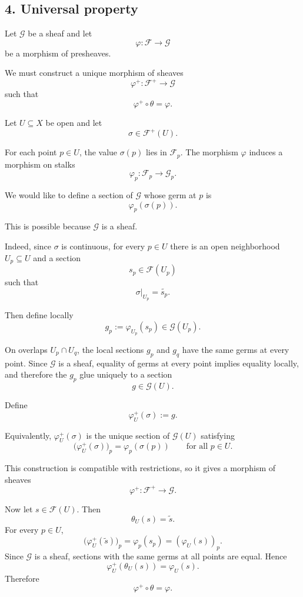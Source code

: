 \documentclass[12pt,a4paper]{article}
\begin{document}
\subsection*{4. Universal property}

Let $\mathcal G$ be a sheaf and let
\[
\varphi : \mathcal F \longrightarrow \mathcal G
\]
be a morphism of presheaves.

We must construct a unique morphism of sheaves
\[
\varphi^+ : \mathcal F^+ \longrightarrow \mathcal G
\]
such that
\[
\varphi^+ \circ \theta = \varphi.
\]

Let $U \subseteq X$ be open and let
\[
\sigma \in \mathcal F^+(U).
\]

For each point $p \in U$, the value $\sigma(p)$ lies in $\mathcal F_p$.
The morphism $\varphi$ induces a morphism on stalks
\[
\varphi_p : \mathcal F_p \longrightarrow \mathcal G_p.
\]

We would like to define a section of $\mathcal G$ whose germ at $p$ is
\[
\varphi_p(\sigma(p)).
\]

This is possible because $\mathcal G$ is a sheaf.

Indeed, since $\sigma$ is continuous, for every $p \in U$ there is an open
neighborhood $U_p \subseteq U$ and a section
\[
s_p \in \mathcal F(U_p)
\]
such that
\[
\sigma|_{U_p} = \widetilde{s_p}.
\]

Then define locally
\[
g_p := \varphi_{U_p}(s_p) \in \mathcal G(U_p).
\]

On overlaps $U_p \cap U_q$, the local sections $g_p$ and $g_q$ have the same
germs at every point. Since $\mathcal G$ is a sheaf, equality of germs at every
point implies equality locally, and therefore the $g_p$ glue uniquely to a
section
\[
g \in \mathcal G(U).
\]

Define
\[
\varphi^+_U(\sigma) := g.
\]

Equivalently, $\varphi^+_U(\sigma)$ is the unique section of $\mathcal G(U)$
satisfying
\[
\bigl(\varphi^+_U(\sigma)\bigr)_p
=
\varphi_p(\sigma(p))
\qquad
\text{for all } p \in U.
\]

This construction is compatible with restrictions, so it gives a morphism of
sheaves
\[
\varphi^+ : \mathcal F^+ \longrightarrow \mathcal G.
\]

Now let $s \in \mathcal F(U)$. Then
\[
\theta_U(s)=\widetilde{s}.
\]
For every $p \in U$,
\[
\bigl(\varphi^+_U(\widetilde{s})\bigr)_p
=
\varphi_p(s_p)
=
(\varphi_U(s))_p.
\]
Since $\mathcal G$ is a sheaf, sections with the same germs at all points are
equal. Hence
\[
\varphi^+_U(\theta_U(s))
=
\varphi_U(s).
\]
Therefore
\[
\varphi^+ \circ \theta = \varphi.
\]
\end{document}
